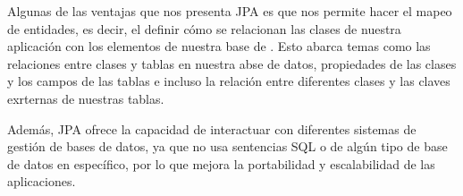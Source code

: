 Algunas de las ventajas que nos presenta JPA es que nos permite hacer el mapeo de entidades, es decir, el definir cómo se relacionan las clases de nuestra aplicación con los elementos de nuestra base de \cite{CitaAJ03}. Esto abarca temas como las relaciones entre clases y tablas en nuestra abse de datos, propiedades de las clases y los campos de las tablas e incluso la relación entre diferentes clases y las claves exrternas de nuestras tablas. 

Además, JPA ofrece la capacidad de interactuar con diferentes sistemas de gestión de bases de datos, ya que no usa sentencias SQL o de algún tipo de base de datos en específico, por lo que mejora la portabilidad y escalabilidad de las aplicaciones. \cite{CitaAJ04}